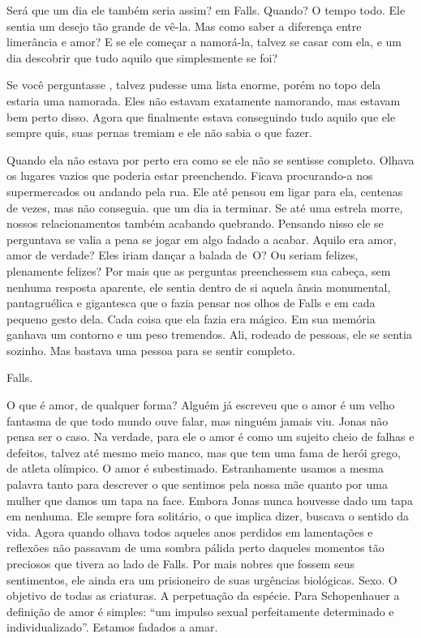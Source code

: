 Será que um dia ele também seria assim?  em Falls. Quando? O tempo todo. Ele sentia um desejo tão grande de vê-la. Mas como saber a diferença entre limerância e amor? E se ele começar a namorá-la, talvez se casar com ela, e um dia descobrir que tudo aquilo que  simplesmente se foi?

Se você perguntasse , talvez  pudesse  uma lista enorme, porém\mudanca{,} no topo dela\mudanca{,} estaria uma namorada. Eles não estavam exatamente namorando, mas estavam bem perto disso. Agora que finalmente estava conseguindo tudo aquilo que ele sempre quis, suas pernas tremiam e ele não sabia o que fazer.

Quando ela não estava por perto era como se ele não se sentisse completo. Olhava os lugares vazios que  poderia estar preenchendo. Ficava procurando-a nos supermercados ou andando pela rua. Ele até pensou em ligar para ela, centenas de vezes, mas não conseguia.  que um dia ia terminar. Se até uma estrela morre, nossos relacionamentos também acabando quebrando. Pensando nisso\mudanca{,} ele se perguntava se valia a pena se jogar em algo fadado a acabar. Aquilo era amor, amor de verdade? Eles iriam dançar a balada de~O? Ou seriam felizes, plenamente felizes? Por mais que as perguntas preenchessem sua cabeça, sem nenhuma resposta aparente, ele sentia dentro de si aquela ânsia monumental, pantagruélica e gigantesca que o fazia pensar nos olhos de Falls e em cada pequeno gesto dela. Cada coisa que ela fazia era mágico. Em sua memória ganhava um contorno e um peso tremendos. Ali, rodeado de pessoas, ele se sentia sozinho. Mas bastava uma pessoa para se sentir completo.

Falls.

O que é amor, de qualquer forma? Alguém já escreveu que o amor é um velho fantasma de que todo mundo ouve falar, mas ninguém jamais viu. Jonas não pensa ser o caso. Na verdade, para ele o amor é como um sujeito cheio de falhas e defeitos, talvez até mesmo meio manco, mas que tem uma fama de herói grego, de atleta olímpico. O amor é subestimado. Estranhamente usamos a mesma palavra tanto para descrever o que sentimos pela nossa mãe quanto por uma mulher que damos um tapa na face. Embora Jonas nunca houvesse dado um tapa em nenhuma. Ele sempre fora solitário, o que implica  dizer, buscava o sentido da vida. Agora\mudanca{,} quando olhava todos aqueles anos perdidos em lamentações e reflexões\mudanca{,} não passavam de uma sombra pálida perto daqueles momentos tão preciosos que tivera ao lado de Falls. Por mais nobres que fossem seus sentimentos, ele ainda era um prisioneiro de suas urgências biológicas. Sexo. O objetivo de todas as criaturas. A perpetuação da espécie. Para Schopenhauer a definição de amor é simples: ``um impulso sexual perfeitamente determinado e individualizado''. Estamos fadados a amar.

